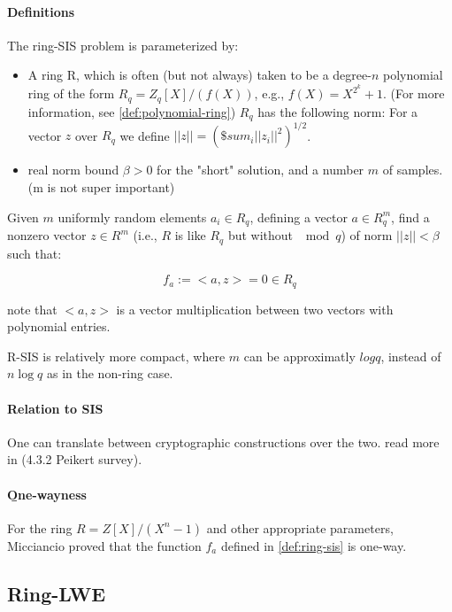 \paragraph{Definitions}
The ring-SIS problem is parameterized by:
\begin{itemize}
    
    \item A ring R, which is often (but not always) taken to be a degree-$n$ polynomial ring of the form
$R_q= Z_q[X]/(f(X))$, e.g., $f(X) = X^{2^k} + 1$. (For more information, see \autoref{def:polynomial-ring})
$R_q$ has the following norm: For a vector $z$ over $R_q$ we define $||z||=(\$sum_i{||z_i||^2})^{1/2}$.
    \item real norm bound $\beta > 0$ for the "short" solution, and a number $m$ of samples. (m is not super important)

\end{itemize}
    
\begin{definition}\label{def:ring-sis}
    Given $m$ uniformly random elements $a_i \in R_q$, defining a vector  $a\in R^m_q$,
find a nonzero vector $z\in R^m$ (i.e., $R$ is like $R_q$ but without $\mod q$) of norm 
$||z||<\beta$ such that:

    $$f_a:=<a,z> = 0\in R_q$$
    

    note that $<a,z>$ is a vector multiplication between two vectors with polynomial entries.
\end{definition}

R-SIS is relatively more compact, where $m$ can be approximatly $log q$, instead of $n\log q$  as in the non-ring case.



\paragraph{Relation to SIS}
One can translate between cryptographic constructions over the two. 
read more in (4.3.2 Peikert survey).


\paragraph{\b One-wayness} For the ring $R= Z[X]/(X^n-1)$ and other appropriate parameters, Micciancio proved that
the function $f_a$ defined in \autoref{def:ring-sis} is one-way.



\subsection{Ring-LWE}

